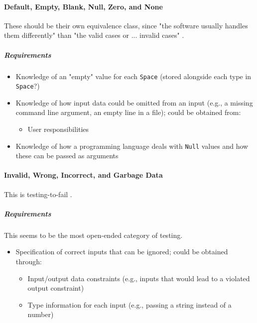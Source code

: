 \paragraph{Default, Empty, Blank, Null, Zero, and None
      \cite[p.~77-78]{patton_software_2006}}

These should be their own equivalence class, since "the software usually
handles them differently" than "the valid cases or ... invalid cases"
\cite[p.~78]{patton_software_2006}.

\subparagraph{Requirements}
\begin{itemize}
      \item Knowledge of an "empty" value for each \texttt{Space} (stored
            alongside each type in \texttt{Space}?)
      \item Knowledge of how input data could be omitted from an input
            (e.g., a missing command line argument, an empty line in a file);
            could be obtained from:
            \begin{itemize}
                  \item User responsibilities
            \end{itemize}
      \item Knowledge of how a programming language deals with \texttt{Null}
            values and how these can be passed as arguments
\end{itemize}

\paragraph{Invalid, Wrong, Incorrect, and Garbage Data
      \cite[p.~78-79]{patton_software_2006}}

This is testing-to-fail \cite[p.~77]{patton_software_2006}.

\subparagraph{Requirements}
This seems to be the most open-ended category of testing.
\begin{itemize}
      \item Specification of correct inputs that can be ignored;
            could be obtained through:
            \begin{itemize}
                  \item Input/output data constraints (e.g., inputs that would
                        lead to a violated output constraint)
                  \item Type information for each input (e.g., passing a string
                        instead of a number)
            \end{itemize}
\end{itemize}

